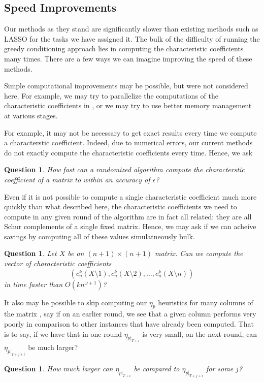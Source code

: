 \documentclass{amsart}
\newtheorem{question}[theorem]{Question}
\theoremstyle{definition}
\begin{document}
\subsection{Speed Improvements}
\label{sec:faster}
Our methods as they stand are significantly slower than existing methods such as LASSO for the tasks we have assigned it.
The bulk of the difficulty of running the greedy conditioning approach lies in computing the characteristic coefficients many times.
There are a few ways we can imagine improving the speed of these methods.

Simple computational improvements may be possible, but were not considered here.
For example, we may try to parallelize the computations of the characteristic coefficients in , or we may try to use better memory management at various stages.

For example, it may not be necessary to get exact results every time we compute a characterstic coefficient.
Indeed, due to numerical errors, our current methods do not exactly compute the characteristic coefficients every time.
Hence, we ask
\begin{question}
    How fast can a randomized algorithm compute the characterstic coefficient of a matrix to within an accuracy of $\epsilon$?
\end{question}

Even if it is not possible to compute a single characteristic coefficient much more quickly than what described here, the characteristic coefficients we need to compute in any given round of the algorithm are in fact all related: they are all Schur complements of a single fixed matrix. Hence, we may ask if we can acheive savings by computing all of these values simulatneously bulk.
\begin{question}
    Let $X$ be an $(n+1) \times (n+1)$ matrix. Can we compute the vector of characteristic coefficients
    \[
        (c_n^k(X \setminus 1), c_n^k(X \setminus 2), \dots, c_n^k(X \setminus n))
    \]
    in time faster than $O(kn^{\omega + 1})$?
\end{question}

It also may be possible to skip computing our $\eta_p$ heuristics for many columns of the matrix , say if on an earlier round, we see that a given column performs very poorly in comparison to other instances that have already been computed.
That is to say, if we have that in one round $\eta_{p|_{T+i}}$ is very small, on the next round, can $\eta_{p|_{T+j+i}}$ be much larger?
\begin{question}
    How much larger can $\eta_{p|_{T+i}}$ be compared to  $\eta_{p|_{T+j+i}}$ for some $j$?
\end{question}
\end{document}
